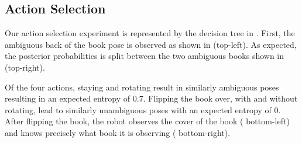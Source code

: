 \vspace{-1ex}
    \subsection{Action Selection}
	Our action selection experiment is represented by the decision tree in .    
	First, the ambiguous back of the book pose is observed as shown in  (top-left). As expected, the posterior probabilities is split between the two ambiguous books shown in  (top-right).    

 Of the four actions, staying and rotating result in similarly ambiguous poses resulting in an expected entropy of $0.7$. Flipping the book over, with and without rotating, lead to similarly unambiguous poses with an expected entropy of $0$. After flipping the book, the robot observes the cover of the book ( bottom-left) and knows precisely what book it is observing ( bottom-right).

    
    

        

